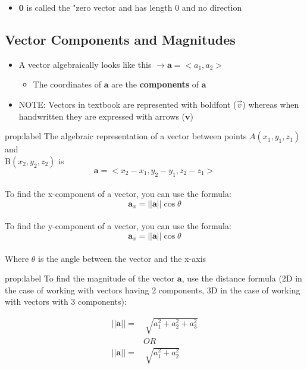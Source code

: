 \documentclass{package/notes}
\begin{document}
	\begin{itemize}
		\item $\mathbf{0}$ is called the "zero vector and has length $0$ and no direction
	\end{itemize}

\subsection{Vector Components and Magnitudes}
	\begin{itemize}
		\item A vector algebraically looks like this $\to \mathbf{a} = <a_1, a_2>$ 
		\begin{itemize}
			\item The coordinates of $\mathbf a$ are the \textbf{components} of $\mathbf a$ 
		\end{itemize}
		\item NOTE: Vectors in textbook are represented with boldfont ($\vec{v}$) whereas when handwritten they are expressed with arrows ($\mathbf{v}$) %
	\end{itemize}

	\newpage
	\begin{proposition}{prop:label}
		The algebraic representation of a vector between points $A(x_1, y_1, z_1)$ and\\ B$(x_2, y_2,z_2)$ is
		$$\mathbf a = <x_2-x_1,y_2-y_1,z_2-z_1>$$\\

		To find the x-component of a vector, you can use the formula:
		$$\mathbf a_x = ||\mathbf a||\cos\theta$$\\

		To find the y-component of a vector, you can use the formula:
		$$\mathbf a_x = ||\mathbf a||\cos\theta$$\\

		Where $\theta$ is the angle between the vector and the x-axis
	\end{proposition}

	\begin{proposition}{prop:label}
		To find the magnitude of the vector $\mathbf a$, use the distance formula (2D in the case of working with vectors having 2 components, 3D in the case of working with vectors with 3 components):

		\begin{equation*}
			\begin{aligned}
				||\mathbf a|| =&\: \sqrt {a_1^2 + a_2^2 + a_3^2}\\
				&OR\\
				||\mathbf a|| =&\: \sqrt {a_1^2 + a_2^2}\\
			\end{aligned}
		\end{equation*}
	\end{proposition}
\end{document}
